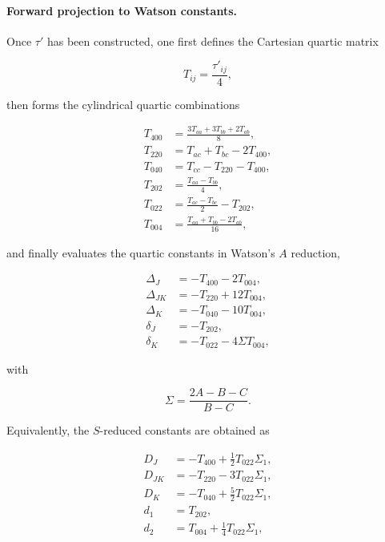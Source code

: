 \paragraph{Forward projection to Watson constants.}

Once $\tau'$ has been constructed, one first defines the Cartesian
quartic matrix

\begin{equation}
T_{ij}=\frac{\tau'_{ij}}{4},
\label{eq:T_from_tauprime}
\end{equation}

then forms the cylindrical quartic combinations

\begin{align}
T_{400} &= \frac{3T_{aa}+3T_{bb}+2T_{ab}}{8}, \\
T_{220} &= T_{ac}+T_{bc}-2T_{400}, \\
T_{040} &= T_{cc}-T_{220}-T_{400}, \\
T_{202} &= \frac{T_{aa}-T_{bb}}{4}, \\
T_{022} &= \frac{T_{ac}-T_{bc}}{2}-T_{202}, \\
T_{004} &= \frac{T_{aa}+T_{bb}-2T_{ab}}{16},
\label{eq:cylindrical_quartic}
\end{align}

and finally evaluates the quartic constants in Watson's $A$ reduction,

\begin{align}
\Delta_J   &= -T_{400}-2T_{004}, \\
\Delta_{JK}&= -T_{220}+12T_{004}, \\
\Delta_K   &= -T_{040}-10T_{004}, \\
\delta_J   &= -T_{202}, \\
\delta_K   &= -T_{022}-4\Sigma T_{004},
\label{eq:watson_A_quartic}
\end{align}

with

\begin{equation}
\Sigma=\frac{2A-B-C}{B-C}.
\end{equation}

Equivalently, the $S$-reduced constants are obtained as

\begin{align}
D_J   &= -T_{400}+\frac12 T_{022}\Sigma_1, \\
D_{JK}&= -T_{220}-3T_{022}\Sigma_1, \\
D_K   &= -T_{040}+\frac52 T_{022}\Sigma_1, \\
d_1   &= T_{202}, \\
d_2   &= T_{004}+\frac14 T_{022}\Sigma_1,
\label{eq:watson_S_quartic}
\end{align}

